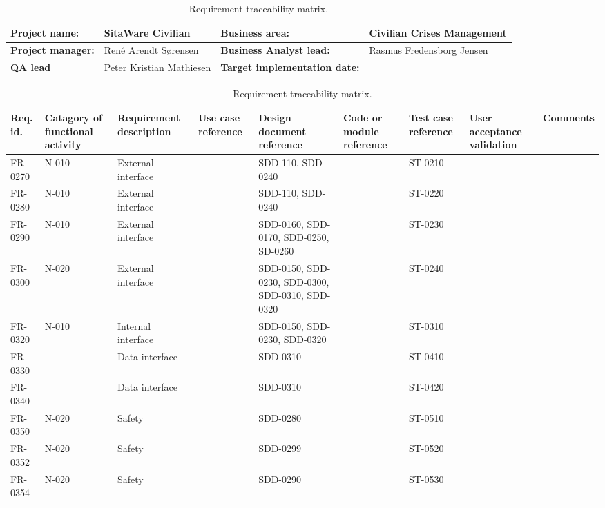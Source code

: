 \begin{sidewaystable}
\begin{table}[H]
\begin{tabular}{|l|l|l|l|}
\hline
 \textbf{Project name:} & SitaWare Civilian & \textbf{Business area:}  & Civilian Crises Management\\ \hline
 \textbf{Project manager:} & René Arendt Sørensen & \textbf{Business Analyst lead:} & Rasmus Fredensborg  Jensen\\ \hline
 \textbf{QA lead} & Peter Kristian Mathiesen & \textbf{Target implementation date:}  & \\ \hline
\end{tabular}	
\begin{tabular}{|p{2cm}|p{2cm}|p{3cm}|p{2cm}|p{2cm}|p{2cm}|p{2cm}|p{2cm}|p{2cm}|}
\hline
 Req. id. & Catagory of functional activity & Requirement description  & Use case reference & Design document reference & Code or module reference & Test case reference & User acceptance validation & Comments\\ \hline
  FR-0270 & N-010 & External interface & &SDD-110, SDD-0240& & ST-0210 & &\\ \hline
 FR-0280 & N-010 & External interface & &SDD-110, SDD-0240 & & ST-0220 & &\\ \hline
 FR-0290 & N-010 & External interface & &SDD-0160, SDD-0170, SDD-0250, SD-0260& & ST-0230 & &\\ \hline
 FR-0300 & N-020 & External interface & &SDD-0150, SDD-0230, SDD-0300, SDD-0310, SDD-0320& & ST-0240 & &\\ \hline
 FR-0320 & N-010 & Internal interface & &SDD-0150, SDD-0230, SDD-0320& & ST-0310 & &\\ \hline
 FR-0330 & & Data interface & &SDD-0310 & & ST-0410 & &\\ \hline
 FR-0340 & & Data interface & &SDD-0310 & & ST-0420 & &\\ \hline
 FR-0350 & N-020 & Safety & &SDD-0280 & & ST-0510 & &\\ \hline
 FR-0352 & N-020 & Safety & &SDD-0299 & & ST-0520 & &\\ \hline 
 FR-0354 & N-020 & Safety & &SDD-0290 & & ST-0530 & &\\ \hline

 
\end{tabular}	
\caption{Requirement traceability matrix.}
\end{table}

\end{sidewaystable}






